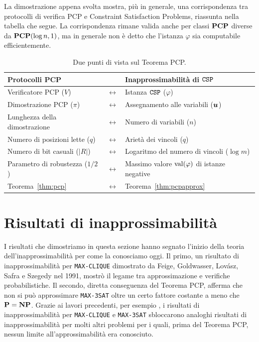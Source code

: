 La dimostrazione appena svolta mostra, più in generale, una corrispondenza
tra protocolli di verifica PCP e Constraint Satisfaction Problems, riassunta
nella tabella che segue.
La corrispondenza rimane valida anche per classi $\mathbf{PCP}$ diverse da
$\mathbf{PCP}(\log n, 1)$, ma in generale non è detto che l'istanza $\varphi$ sia
computabile efficientemente.

\begin{table}[htbp]
	\centering
	\small
	\renewcommand{\arraystretch}{1.35}
	\begin{tabular}{p{5.5cm} c p{7.0cm}}
		\hline
		\rule{0pt}{1.5em}\textbf{Protocolli PCP} & & \textbf{Inapprossimabilità di $\mathtt{CSP}$} \\[0.4em]
		\hline
		Verificatore PCP ($V$) & $\longleftrightarrow$ &
			Istanza $\mathtt{CSP}$ ($\varphi$) \\
		Dimostrazione PCP ($\pi$) & $\longleftrightarrow$ &
			Assegnamento alle variabili ($\bm{u}$) \\
		Lunghezza della dimostrazione & $\longleftrightarrow$ &
			Numero di variabili ($n$) \\
		Numero di posizioni lette ($q$) & $\longleftrightarrow$ &
			Arietà dei vincoli ($q$) \\
		Numero di bit casuali ($|R|$) & $\longleftrightarrow$ &
			Logaritmo del numero di vincoli ($\log m$) \\
		Parametro di robustezza ($1/2$) & $\longleftrightarrow$ &
			Massimo valore $\operatorname{val}(\varphi)$ di istanze negative \\
		Teorema~\ref{thm:pcp} & $\longleftrightarrow$ & Teorema~\ref{thm:pcpapprox} \\
		\hline
	\end{tabular}
	\caption{Due punti di vista sul Teorema PCP.}
	\label{tab:due-punti-di-vista-pcp}
\end{table}

\section{Risultati di inapprossimabilità}

I risultati che dimostriamo in questa sezione hanno segnato l'inizio della
teoria dell'inapprossimabilità per come la conosciamo oggi.
Il primo, un risultato di inapprossimabilità per \texttt{MAX-CLIQUE} dimostrato
da Feige, Goldwasser, Lovász, Safra e Szegedy nel 1991, mostrò il legame tra
approssimazione e verifiche probabilistiche.
Il secondo, diretta conseguenza del Teorema PCP, afferma che non si può
approssimare \texttt{MAX-3SAT} oltre un certo fattore costante a meno che
$\mathbf{P} = \mathbf{NP}$.
Grazie ai lavori precedenti, per esempio \cite{PY91, BS92, PR93},
i risultati di inapprossimabilità per \texttt{MAX-CLIQUE} e \texttt{MAX-3SAT}
sbloccarono analoghi risultati di inapprossimabilità per molti altri problemi
per i quali, prima del Teorema PCP, nessun limite all'approssimabilità era
conosciuto.

